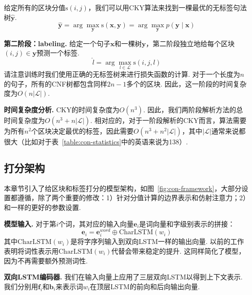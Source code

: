 给定所有的区块分值$\mathrm{s}(i,j)$，我们可以用CKY算法来找到一棵最优的无标签句法树$\hat{\boldsymbol{y}}$.
\begin{equation} \label{eq:tree-argmax}
    \hat{\boldsymbol{y}} = \arg\max_{\boldsymbol{y}} \mathrm{s}(\boldsymbol{x}, \boldsymbol{y}) = \arg\max_{\boldsymbol{y}} p(\boldsymbol{y} \mid \boldsymbol{x})
\end{equation}

\noindent\textbf{第二阶段：labeling.}
给定一个句子$\boldsymbol{x}$和一棵树$\boldsymbol{y}$，第二阶段独立地给每个区块$(i,j) \in \boldsymbol{y}$预测一个标签.
\begin{equation} \label{eq:label-argmax}
    \hat{l} = \arg\max_{l \in \mathcal{L}} \mathrm{s}(i,j,l)
\end{equation}
请注意训练时我们使用正确的无标签树来进行损失函数的计算.
对于一个长度为$n$的句子，所有的CNF树都包含同样$2n-1$多个的区块.
因此，这一阶段的时间复杂度为$O(n|\mathcal{L}|)$.

\noindent\textbf{时间复杂度分析.}
CKY的时间复杂度为$O(n^3)$.
因此，我们两阶段解析方法的总时间复杂度为$O(n^3+n|\mathcal{L}|)$.
相对应的，对于一阶段解析的CKY而言，算法需要为所有$n^2$个区块决定最优的标签，因此需要$O(n^3+n^2|\mathcal{L}|)$，其中$|\mathcal{L}|$通常来说都很大（比如对于表~\ref{table:con-statistics}中的英语来说为138）.

\subsection{打分架构}

本章节引入了给区块和标签打分的模型架构，如图~\ref{fig:con-framework}，大部分设置都遵循\cite{stern-etal-2017-minimal}，除了两个重要的修改：1）针对分值计算的边界表示和仿射注意力；2）和\cite{Timothy-d17-biaffine}一样的更好的参数设置.

\noindent\textbf{模型输入.}
对于第$i$个词，其对应的输入向量$\mathbf{e}_i$是词向量和字级别表示的拼接：
\begin{equation} \label{eq:token-representation}
    \mathbf{e}_i = \mathbf{e}^{word}_i \oplus \mathrm{CharLSTM}(w_i)
\end{equation}
其中$\mathrm{CharLSTM}(w_i)$是将字序列输入到双向LSTM一样的输出向量\cite{lample-etal-2016-neural}.
以前的工作表明将词性表示用$\mathrm{CharLSTM}(w_i)$代替会带来稳定的提升\cite{kitaev-klein-2018-constituency}.
这同样简化了模型，因为不再需要额外预测词性.

\noindent\textbf{双向LSTM编码器.}
我们在输入向量上应用了三层双向LSTM以得到上下文表示.
我们分别用$\mathbf{f}_i$和$\mathbf{b}_i$来表示词$w_i$在顶层LSTM的前向和后向输出向量.

